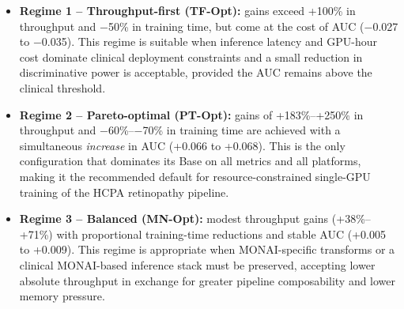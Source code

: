 \begin{itemize}
  \item \textbf{Regime 1 -- Throughput-first (TF-Opt):} gains exceed
        +100\% in throughput and $-$50\% in training time, but come at
        the cost of AUC ($-$0.027 to $-$0.035).  This regime is suitable
        when inference latency and GPU-hour cost dominate clinical
        deployment constraints and a small reduction in discriminative
        power is acceptable, provided the AUC remains above the
        clinical threshold.

  \item \textbf{Regime 2 -- Pareto-optimal (PT-Opt):} gains of
        +183\%--+250\% in throughput and $-$60\%--$-$70\% in training
        time are achieved with a simultaneous \emph{increase} in AUC
        (+0.066 to +0.068).  This is the only configuration that
        dominates its Base on all metrics and all platforms, making it
        the recommended default for resource-constrained single-GPU
        training of the HCPA retinopathy pipeline.

  \item \textbf{Regime 3 -- Balanced (MN-Opt):} modest throughput gains
        (+38\%--+71\%) with proportional training-time reductions and
        stable AUC (+0.005 to +0.009).  This regime is appropriate when
        MONAI-specific transforms or a clinical MONAI-based inference
        stack must be preserved, accepting lower absolute throughput in
        exchange for greater pipeline composability and lower memory
        pressure.
\end{itemize}
